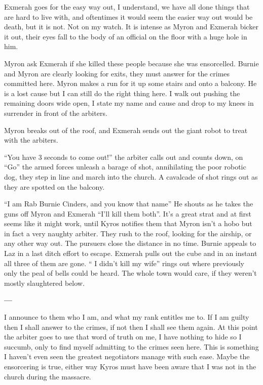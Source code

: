 Exmerah goes for the easy way out, I understand, we have all done things that are hard to live with, and oftentimes it would seem the easier way out would be death, but it is not. Not on my watch. It is intense as Myron and Exmerah bicker it out, their eyes fall to the body of an official on the floor with a huge hole in him.\medskip

Myron ask Exmerah if she killed these people because she was ensorcelled. Burnie and Myron are clearly looking for exits, they must answer for the crimes committed here. Myron makes a run for it up some stairs and onto a balcony. He is a lost cause but I can still do the right thing here. I walk out pushing the remaining doors wide open, I state my name and cause and drop to my knees in surrender in front of the arbiters.\medskip

Myron breaks out of the roof, and Exmerah sends out the giant robot to treat with the arbiters.\medskip

“You have 3 seconds to come out!” the arbiter calls out and counts down, on “Go” the armed forces unleash a barage of shot, annihilating the poor robotic dog, they step in line and march into the church. A cavalcade of shot rings out as they are spotted on the balcony.\medskip

“I am Rab Burnie Cinders, and you know that name” He shouts as he takes the guns off Myron and Exmerah “I’ll kill them both”. It’s a great strat and at first seems like it might work, until Kyros notifies them that Myron isn’t a hobo but in fact a very naughty arbiter. They rush to the roof, looking for the airship, or any other way out. The pursuers close the distance in no time. Burnie appeals to Laz in a last ditch effort to escape. Exmerah pulls out the cube and in an instant all three of them are gone. “ I didn’t kill my wife” rings out where previously only the peal of bells could be heard. The whole town would care, if they weren’t mostly slaughtered below.\medskip

\textbf{---}\medskip

I announce to them who I am, and what my rank entitles me to. If I am guilty then I shall answer to the crimes, if not then I shall see them again. At this point the arbiter goes to use that word of truth on me, I have nothing to hide so I succumb, only to find myself admitting to the crimes seen here. This is something I haven’t even seen the greatest negotiators manage with such ease. Maybe the ensorcering is true, either way Kyros must have been aware that I was not in the church during the massacre.\medskip

